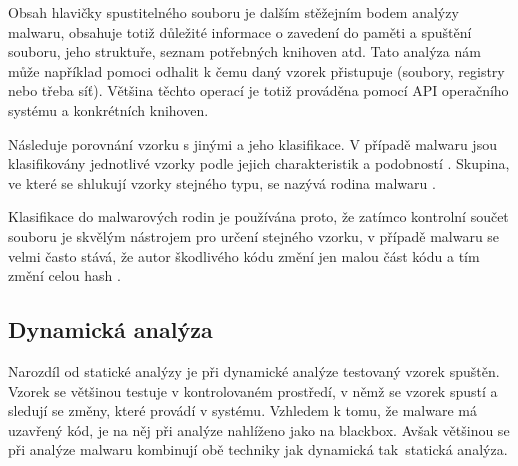 Obsah hlavičky spustitelného souboru je dalším stěžejním bodem analýzy malwaru, obsahuje totiž důležité informace o zavedení do paměti a spuštění souboru, jeho struktuře, seznam potřebných knihoven atd. Tato analýza nám může například pomoci odhalit k čemu daný vzorek přistupuje (soubory, registry nebo třeba síť). Většina těchto operací je totiž prováděna pomocí API operačního systému a konkrétních knihoven. 

Následuje porovnání vzorku s jinými a jeho klasifikace. V případě malwaru jsou klasifikovány jednotlivé vzorky podle jejich charakteristik a podobností \cite{kaspersky_malware_classification}. Skupina, ve které se shlukují vzorky stejného typu, se nazývá rodina malwaru \cite{6107902}. 

Klasifikace do malwarových rodin je používána proto, že zatímco kontrolní součet souboru je skvělým nástrojem pro určení stejného vzorku, v případě malwaru se velmi často stává, že autor škodlivého kódu změní jen malou část kódu a tím změní celou hash \cite{monnappaka2018}.

\subsection{Dynamická analýza}
Narozdíl od statické analýzy je při dynamické analýze testovaný vzorek spuštěn. Vzorek se většinou testuje v kontrolovaném prostředí, v němž se vzorek spustí a sledují se změny, které provádí v systému. Vzhledem k tomu, že malware má uzavřený kód, je na něj při analýze nahlíženo jako na blackbox. Avšak většinou se při analýze malwaru kombinují obě techniky jak dynamická tak~statická analýza.

